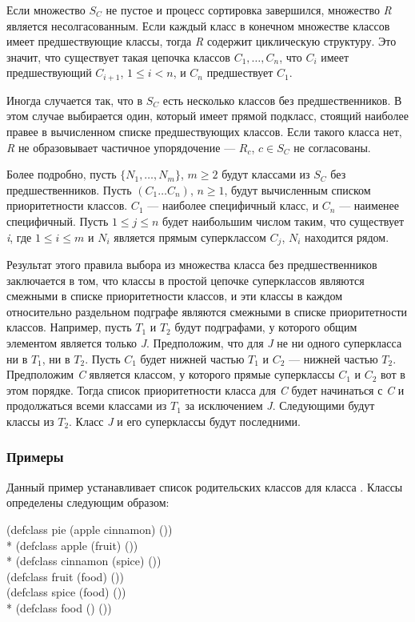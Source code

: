 Если множество $S_{C}$ не пустое и процесс сортировка завершился, множество
\emph{R} является несолгасованным. Если каждый класс в конечном множестве
классов имеет предшествующие классы, тогда \emph{R} содержит циклическую
структуру. Это значит, что существует такая цепочка классов $C_1,\ldots,C_{n}$,
что $C_{i}$ имеет предшествующий $C_{i+1}$, $1\leq i<n$, и $C_{n}$ предшествует
$C_1$.

Иногда случается так, что в $S_{C}$ есть несколько классов без предшественников.
В этом случае выбирается один, который имеет прямой подкласс, стоящий наиболее
правее в вычисленном списке предшествующих классов.
Если такого класса нет, \emph{R} не образовывает частичное упорядочение ---
$R_{c}$, $c\in S_{C}$ не согласованы.

Более подробно, пусть $\{N_1,\ldots,N_{m}\}$,
$m\geq 2$ будут классами из $S_{C}$ без предшественников. Пусть $(C_1\ldots C_{n})$, $n\geq
1$, будут вычисленным списком приоритетности классов. $C_1$ --- наиболее
специфичный класс, и $C_n$ --- наименее специфичный. Пусть $1\leq j\leq n$ будет
наибольшим числом таким, что существует \emph{i}, где $1\leq i\leq m$ и $N_{i}$
является прямым суперклассом $C_{j}$, $N_{i}$ находится рядом.

Результат этого правила выбора из множества класса без предшественников
заключается в том, что классы в простой цепочке суперклассов являются смежными в
списке приоритетности классов, и эти классы в каждом относительно раздельном
подграфе являются смежными в списке приоритетности классов. Например, пусть
$T_1$ и $T_2$ будут подграфами, у которого общим элементом является только
\emph{J}. Предположим, что для \emph{J} не ни одного суперкласса ни в $T_1$, ни
в $T_2$. Пусть $C_1$ будет нижней частью $T_1$ и $C_2$ --- нижней частью
$T_2$. Предположим \emph{C} является классом, у которого прямые суперклассы
$C_1$ и $C_2$ вот в этом порядке. Тогда список приоритетности класса для
\emph{C} будет начинаться с \emph{C} и продолжаться всеми классами из $T_1$ за
исключением \emph{J}. Следующими будут классы из $T_2$. Класс \emph{J} и его
суперклассы будут последними.

\subsubsection{Примеры}

Данный пример устанавливает список родительских классов для класса
. Классы определены следующим образом:

\begin{lisp}
(defclass pie (apple cinnamon) ()) \\*
(defclass apple (fruit) ()) \\*
(defclass cinnamon (spice) ()) \\
(defclass fruit (food) ()) \\
(defclass spice (food) ()) \\*
(defclass food () ())
\end{lisp}

